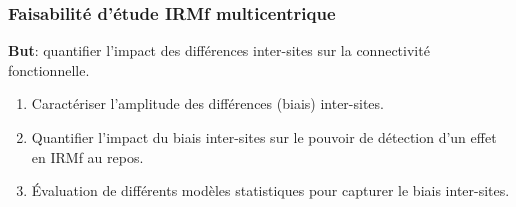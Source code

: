 \documentclass{beamer}
\begin{document}
\begin{frame}
\frametitle{Faisabilité d’étude IRMf multicentrique}
\textbf{But}: quantifier l’impact des différences inter-sites sur la connectivité fonctionnelle.
\begin{enumerate}
\item Caractériser l’amplitude des différences (biais) inter-sites.
\item Quantifier l’impact du biais inter-sites sur le pouvoir de détection d’un effet en IRMf au repos.
\item Évaluation de différents modèles statistiques pour capturer le biais inter-sites.
\end{enumerate}
\end{frame}



\end{document}
